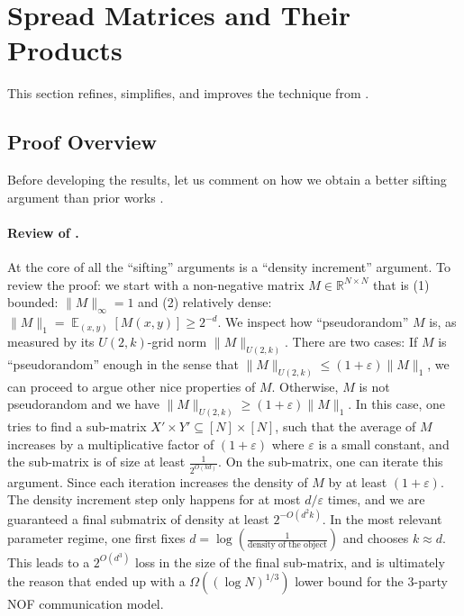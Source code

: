 \documentclass[11pt]{article}
\DeclareMathOperator*{\E}{\mathbb{E}}
\newcommand{\1}{ \mathbbm{1}}
\newcommand{\eps}{\varepsilon}
\begin{document}
\section{Spread Matrices and Their Products}\label{sec: spread matrix}

This section refines, simplifies, and improves the technique from \cite[Section 4]{KelleyLM2024-nof}.

\subsection{Proof Overview}\label{sec: spread matrix overview}

Before developing the results, let us comment on how we obtain a better sifting argument than prior works \cite{KelleyM2023strong,KelleyLM2024-nof}. 

\paragraph*{Review of \cite{KelleyLM2024-nof}.} At the core of all the ``sifting'' arguments is a ``density increment'' argument. To review the \cite{KelleyLM2024-nof} proof: we start with a non-negative matrix $M\in \mathbb{R}^{N\times N}$ that is (1) bounded: $\|M\|_{\infty} = 1$ and (2) relatively dense: $\|M\|_1 = \E_{(x,y)}[M(x,y)] \ge 2^{-d}$. We inspect how ``pseudorandom'' $M$ is, as measured by its $U(2,k)$-grid norm $\|M\|_{U(2,k)}$. There are two cases: If $M$ is ``pseudorandom'' enough in the sense that $\| M \|_{U(2,k)} \le (1+\varepsilon) \|M\|_{1}$, we can proceed to argue other nice properties of $M$. Otherwise, $M$ is not pseudorandom and we have $\|M\|_{U(2,k)}\ge (1+\varepsilon)\|M\|_1$. In this case, one tries to find a sub-matrix $X'\times Y'\subseteq [N]\times [N]$, such that the average of $M$ increases by a multiplicative factor of $(1+\varepsilon)$ where $\eps$ is a small constant, and the sub-matrix is of size at least $\frac{1}{2^{O(k d)}}$. On the sub-matrix, one can iterate this argument. Since each iteration increases the density of $M$ by at least $(1+\varepsilon)$. The density increment step only happens for at most $d/\varepsilon$ times, and we are guaranteed a final submatrix of density at least $2^{-O(d^2 k)}$. In the most relevant parameter regime, one first fixes $d = \log(\frac{1}{\text{density of the object}})$ and chooses $k\approx d$. This leads to a $2^{O(d^3)}$ loss in the size of the final sub-matrix, and is ultimately the reason that \cite{KelleyLM2024-nof} ended up with a $\Omega((\log N)^{1/3})$ lower bound for the $3$-party NOF communication model.
\end{document}
